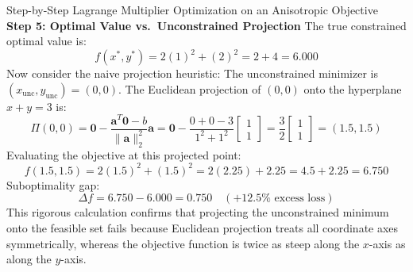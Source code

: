 \begin{examplebox}[breakable]{Step-by-Step Lagrange Multiplier Optimization on an Anisotropic Objective}
\textbf{Step 5: Optimal Value vs.\ Unconstrained Projection}
The true constrained optimal value is:
\begin{equation}
f(x^*, y^*) = 2(1)^2 + (2)^2 = 2 + 4 = 6.000
\end{equation}
Now consider the naive projection heuristic:
The unconstrained minimizer is $(x_{\text{unc}}, y_{\text{unc}}) = (0, 0)$.
The Euclidean projection of $(0, 0)$ onto the hyperplane $x + y = 3$ is:
\begin{equation}
\Pi(0, 0) = \mathbf{0} - \frac{\mathbf{a}^T \mathbf{0} - b}{\|\mathbf{a}\|_2^2} \mathbf{a} = \mathbf{0} - \frac{0 + 0 - 3}{1^2 + 1^2} \begin{bmatrix} 1 \\ 1 \end{bmatrix} = \frac{3}{2} \begin{bmatrix} 1 \\ 1 \end{bmatrix} = (1.5, 1.5)
\end{equation}
Evaluating the objective at this projected point:
\begin{equation}
f(1.5, 1.5) = 2(1.5)^2 + (1.5)^2 = 2(2.25) + 2.25 = 4.5 + 2.25 = 6.750
\end{equation}
Suboptimality gap:
\begin{equation}
\Delta f = 6.750 - 6.000 = 0.750 \quad (+12.5\% \text{ excess loss})
\end{equation}
This rigorous calculation confirms that projecting the unconstrained minimum onto the feasible set fails because Euclidean projection treats all coordinate axes symmetrically, whereas the objective function is twice as steep along the $x$-axis as along the $y$-axis.
\end{examplebox}

